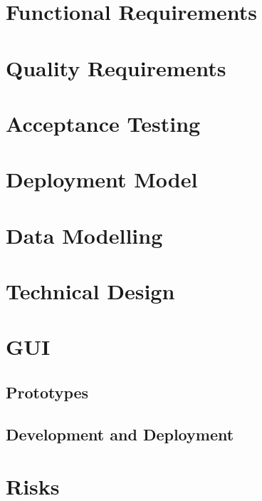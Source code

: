 \documentclass{article}
\begin{document}
	\section{Functional Requirements}
	
	\pagebreak
	
	\section{Quality Requirements}
	
	\pagebreak
	
	\section{Acceptance Testing}
	
	\pagebreak
	
	\section{Deployment Model}
	
	\pagebreak
	
	\section{Data Modelling}
	
	\pagebreak
	
	\section{Technical Design}
	
	\pagebreak
	
	\section{GUI}
	\subsection{Prototypes}
	
	
	\pagebreak
	
	\subsection{Development and Deployment}
	
	
	\pagebreak
	
	\section{Risks}
	
	\pagebreak
	
\end{document}
